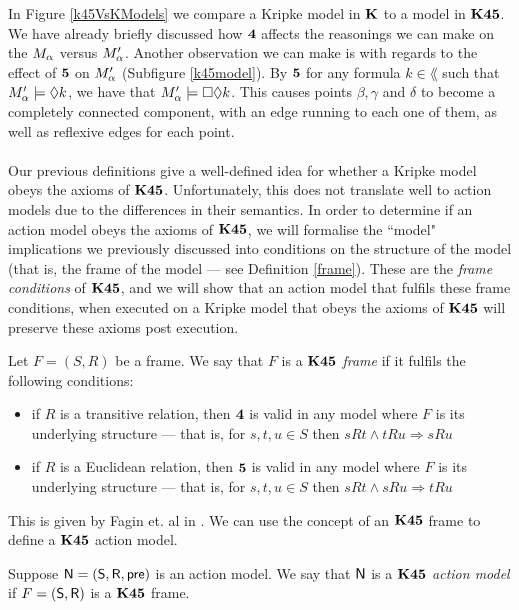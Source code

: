 In Figure \ref{k45VsKModels} we compare a Kripke model in $\bf K$ to a model in $\bf K45$.
We have already briefly discussed how $\bf 4$ affects the reasonings we can make on the $M_\alpha$ versus
$M'_\alpha$.
Another observation we can make is with regards to the effect of $\bf 5$ on $M'_\alpha$ (Subfigure
\ref{k45model}).
By $\bf 5$ for any formula $k \in \lang$ such that $M'_\alpha \models
\Diamond k$, we have that $M'_\alpha \models \Box \Diamond k$.
This causes points $\beta, \gamma$ and $\delta$ to become a completely connected component,
with an edge running to each one of them, as well as reflexive edges for each point.\\
\\
Our previous definitions give a well-defined idea for whether a Kripke model obeys the axioms of $\bf K45$.
Unfortunately, this does not translate well to action models due to the differences in their
semantics.
In order to determine if an action model obeys the axioms of $\bf K45$, we will formalise the ``model"
implications we previously discussed into conditions on the structure of the model (that is, the
frame of the model --- see Definition \ref{frame}).
These are the {\em frame conditions} of $\bf K45$, and we will show that an action model that fulfils these
frame conditions, when executed on a Kripke model that obeys the axioms of $\bf K45$ will preserve
these axioms post execution.

\begin{defn} \label{lemma:k45frameconditions}
	Let $F = (S,R)$ be a frame.
	We say that $F$ is a {\em $\bf K45$ frame} if it fulfils the following conditions:
	\begin{itemize}
		\item if $R$ is a transitive relation, then $\bf 4$ is valid in any model where $F$ is its
			underlying structure --- that is, for $s, t, u \in S$ then $s R t \land t R u \Rightarrow s R u$
		\item if $R$ is a Euclidean relation, then $\bf 5$ is valid in any model where $F$ is its
			underlying structure --- that is, for $s, t, u \in S$ then $s R t \land s R u \Rightarrow t R u$
	\end{itemize}
\end{defn}

This is given by Fagin et. al in \cite{fagin1995reasoning}.
We can use the concept of an $\bf K45$ frame to define a $\bf K45$ action model.

\begin{defn} \label{defn:k45eventModel}
	Suppose $\mathrm{\mathsf{N}} = (\mathrm{\mathsf{S}}, \mathrm{\mathsf{R}}, \mathrm{\mathsf{pre}})$ is an action model.
	We say that $\mathrm{\mathsf{N}}$ is a {\em $\bf K45$ action model} if $F = (\mathrm{\mathsf{S}}, \mathrm{\mathsf{R}})$ is a $\bf K45$ frame.
\end{defn}

